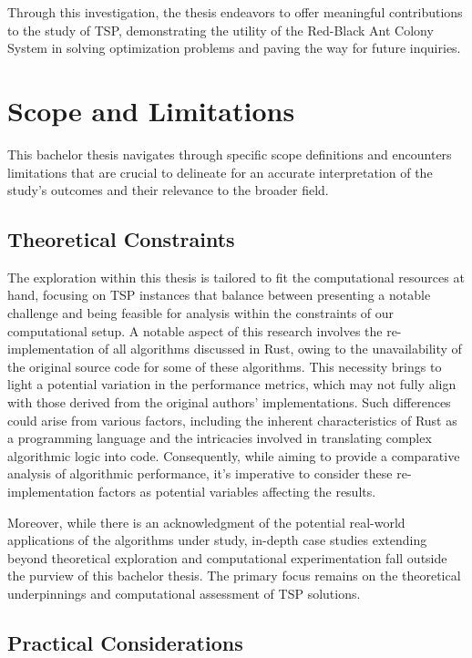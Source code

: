 Through this investigation, the thesis endeavors to offer meaningful contributions to the study of TSP, demonstrating the utility of the Red-Black Ant Colony System in solving optimization problems and paving the way for future inquiries.

\section{Scope and Limitations}

This bachelor thesis navigates through specific scope definitions and encounters limitations that are crucial to delineate for an accurate interpretation of the study's outcomes and their relevance to the broader field.

\subsection{Theoretical Constraints}

The exploration within this thesis is tailored to fit the computational resources at hand, focusing on TSP instances that balance between presenting a notable challenge and being feasible for analysis within the constraints of our computational setup. A notable aspect of this research involves the re-implementation of all algorithms discussed in Rust, owing to the unavailability of the original source code for some of these algorithms. This necessity brings to light a potential variation in the performance metrics, which may not fully align with those derived from the original authors' implementations. Such differences could arise from various factors, including the inherent characteristics of Rust as a programming language and the intricacies involved in translating complex algorithmic logic into code. Consequently, while aiming to provide a comparative analysis of algorithmic performance, it's imperative to consider these re-implementation factors as potential variables affecting the results.

Moreover, while there is an acknowledgment of the potential real-world applications of the algorithms under study, in-depth case studies extending beyond theoretical exploration and computational experimentation fall outside the purview of this bachelor thesis. The primary focus remains on the theoretical underpinnings and computational assessment of TSP solutions.

\subsection{Practical Considerations}

